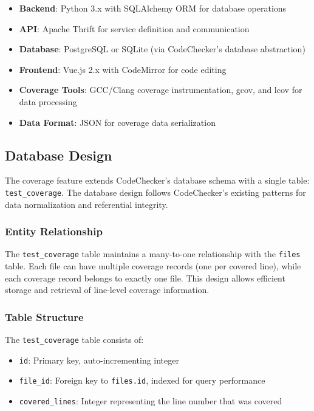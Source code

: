 \begin{itemize}
    \item \textbf{Backend}: Python 3.x with SQLAlchemy ORM for database operations
    \item \textbf{API}: Apache Thrift for service definition and communication
    \item \textbf{Database}: PostgreSQL or SQLite (via CodeChecker's database abstraction)
    \item \textbf{Frontend}: Vue.js 2.x with CodeMirror for code editing
    \item \textbf{Coverage Tools}: GCC/Clang coverage instrumentation, gcov, and lcov for data processing
    \item \textbf{Data Format}: JSON for coverage data serialization
\end{itemize}

\subsection{Database Design}

The coverage feature extends CodeChecker's database schema with a single table: \texttt{test\_coverage}. The database design follows CodeChecker's existing patterns for data normalization and referential integrity.

\subsubsection{Entity Relationship}

The \texttt{test\_coverage} table maintains a many-to-one relationship with the \texttt{files} table. Each file can have multiple coverage records (one per covered line), while each coverage record belongs to exactly one file. This design allows efficient storage and retrieval of line-level coverage information.

\subsubsection{Table Structure}

The \texttt{test\_coverage} table consists of:
\begin{itemize}
    \item \texttt{id}: Primary key, auto-incrementing integer
    \item \texttt{file\_id}: Foreign key to \texttt{files.id}, indexed for query performance
    \item \texttt{covered\_lines}: Integer representing the line number that was covered
\end{itemize}

